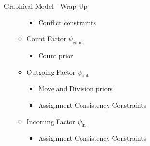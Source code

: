\begin{frame}{Graphical Model - Wrap-Up}
\begin{minipage}{0.71\textwidth}
\begin{itemize}
\begin{itemize}
\begin{itemize}
                      \item[] Conflict constraints
                \end{itemize}
                  \item[\usebox{\countFac}] Count Factor $\psi_{\text{count}}$
                \begin{itemize}
                      \item[] Count prior
                \end{itemize}
                  \item[\usebox{\outFac}] Outgoing Factor $\psi_{\text{out}}$
                \begin{itemize}
                      \item[] Move and Division priors
                      \item[] Assignment Consistency Constraints
                \end{itemize}
                  \item[\usebox{\inFac}] Incoming Factor $\psi_{\text{in}}$
                \begin{itemize}
                      \item[] Assignment Consistency Constraints
                \end{itemize}
        \end{itemize}
    \end{itemize}
    \end{minipage}
    \begin{minipage}{0.25\textwidth}
        \newcommand{\distancebetweenlayers}{60}
        \newcommand{\scalingfactor}{0.8}
        \scalebox{0.55}{
            \begin{tikzpicture}[every node/.append style={scale=0.98}]
                
            \end{tikzpicture}
        }\hfill
        \vfill
    \end{minipage}
\end{frame}

